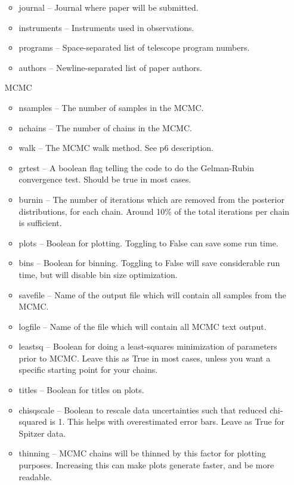 \documentclass[letterpaper,12pt]{article}
\begin{document}
\begin{itemize}
\begin{itemize}
\item journal -- Journal where paper will be submitted.

\item instruments -- Instruments used in observations.

\item programs -- Space-separated list of telescope program numbers.

\item authors -- Newline-separated list of paper authors.
\end{itemize}
\item [MCMC]
\begin{itemize}
\item nsamples -- The number of samples in the MCMC.

\item nchains -- The number of chains in the MCMC.

\item walk -- The MCMC walk method. See p6 description.

\item grtest -- A boolean flag telling the code to do the
  Gelman-Rubin convergence test. Should be true in most cases.

\item burnin -- The number of iterations which are removed from the
  posterior distributions, for each chain. Around 10\% of the total
  iterations per chain is sufficient.

\item plots -- Boolean for plotting. Toggling to False can save some
  run time.

\item bins -- Boolean for binning. Toggling to False will save
  considerable run time, but will disable bin size optimization.

\item savefile -- Name of the output file which will contain all
  samples from the MCMC.

\item logfile -- Name of the file which will contain all MCMC
  text output.

\item leastsq -- Boolean for doing a least-squares minimization of
  parameters prior to MCMC. Leave this as True in most cases, unless
  you want a specific starting point for your chains.

\item titles -- Boolean for titles on plots. 

\item chisqscale -- Boolean to rescale data uncertainties such that
  reduced chi-squared is 1. This helps with overestimated error bars.
  Leave as True for Spitzer data.

\item thinning -- MCMC chains will be thinned by this factor for
  plotting purposes. Increasing this can make plots generate faster,
  and be more readable.

  \end{itemize}
\end{itemize}
\end{document}
